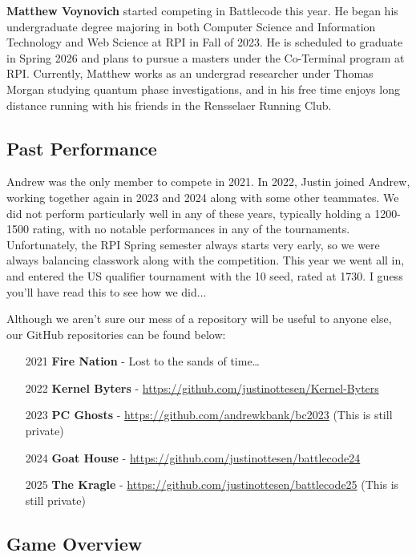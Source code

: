 \medskip

\textbf{Matthew Voynovich} started competing in Battlecode this year. He began his undergraduate degree majoring in both Computer Science and Information Technology and Web Science at RPI in Fall of 2023. He is scheduled to graduate in Spring 2026 and plans to pursue a masters under the Co-Terminal program at RPI. Currently, Matthew works as an undergrad researcher under Thomas Morgan studying quantum phase investigations, and in his free time enjoys long distance running with his friends in the Rensselaer Running Club.

\newpage
\subsection{Past Performance}

Andrew was the only member to compete in 2021. In 2022, Justin joined Andrew, working together again in 2023 and 2024 along with some other teammates. We did not perform particularly well in any of these years, typically holding a 1200-1500 rating, with no notable performances in any of the tournaments. Unfortunately, the RPI Spring semester always starts very early, so we were always balancing classwork along with the competition. This year we went all in, and entered the US qualifier tournament with the 10 seed, rated at 1730. I guess you'll have read this to see how we did...

\medskip

Although we aren't sure our mess of a repository will be useful to anyone else, our GitHub repositories can be found below:
\begin{enumerate}
  \item[2021] \textbf{Fire Nation} - Lost to the sands of time\dots
  \item[2022] \textbf{Kernel Byters} - \url{https://github.com/justinottesen/Kernel-Byters}
  \item[2023] \textbf{PC Ghosts} - \url{https://github.com/andrewkbank/bc2023} (This is still private)
  \item[2024] \textbf{Goat House} - \url{https://github.com/justinottesen/battlecode24}
  \item[2025] \textbf{The Kragle} - \url{https://github.com/justinottesen/battlecode25} (This is still private)
\end{enumerate}

\subsection{Game Overview}


